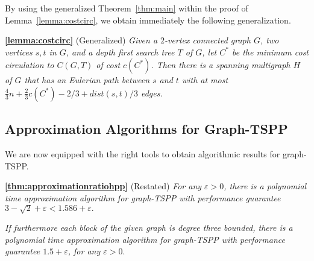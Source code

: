 \documentclass[letterpaper,11pt]{article}
\newenvironment{applemma}{\begin{trivlist}
        \item[\hskip\labelsep {\bf Lemma}]}{ \end{trivlist}}
\newenvironment{apptheorem}{\begin{trivlist}
        \item[\hskip\labelsep {\bf Theorem}]}{ \end{trivlist}}
\newcommand{\HPP}{graph-TSPP\xspace}
\newcommand{\dist}[1]{\ensuremath{dist(#1)}}
\begin{document}
By using the generalized Theorem~\ref{thm:main} within the proof of
Lemma~\ref{lemma:costcirc}, we obtain immediately the following generalization.

\begin{applemma}{\textbf{\ref{lemma:costcirc}}} (Generalized) \emph{
  Given a $2$-vertex connected graph $G$, two vertices $s,t$ in $G$, and a depth first search tree
  $T$ of $G$, let $C^*$ be the minimum cost circulation to
  $C(G,T)$ of cost $c(C^*)$. Then there is a spanning multigraph $H$ of $G$ that
  has an Eulerian path between $s$ and $t$ with at
  most $\frac{4}{3}n + \frac{2}{3} c(C^*) - 2/3 + \dist{s,t}/3$ edges.}
\end{applemma}

\subsection{Approximation Algorithms for Graph-TSPP}
We are now equipped with the right tools to obtain algorithmic results for \HPP.
\begin{apptheorem}{\textbf{\ref{thm:approximationratiohpp}}} (Restated)\emph{
  For any $\varepsilon > 0$, there is a polynomial time approximation algorithm for
  \HPP with performance guarantee 
  $3-\sqrt{2} + \varepsilon < 1.586 + \varepsilon.$}

\emph{
If furthermore each block of the given graph is degree three bounded, there is a
polynomial time approximation algorithm for \HPP with performance
guarantee $1.5 + \varepsilon$, for any $\varepsilon>0$}.
\end{apptheorem}
\end{document}
